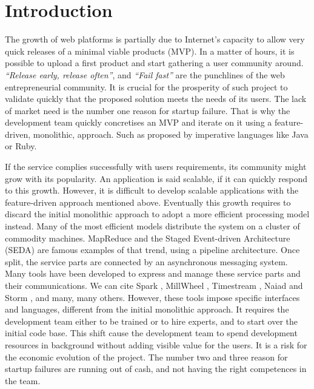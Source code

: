 \section{Introduction}

The growth of web platforms is partially due to Internet's capacity to allow very quick releases of a minimal viable products (MVP).
In a matter of hours, it is possible to upload a first product and start gathering a user community around.
\textit{``Release early, release often''}, and \textit{``Fail fast''} are the punchlines of the web entrepreneurial community.
It is crucial for the prosperity of such project to validate quickly that the proposed solution meets the needs of its users.
The lack of market need is the number one reason for startup failure.
That is why the development team quickly concretises an MVP and iterate on it using a feature-driven, monolithic, approach.
Such as proposed by imperative languages like Java or Ruby.

If the service complies successfully with users requirements, its community might grow with its popularity.
An application is said scalable, if it can quickly respond to this growth.
However, it is difficult to develop scalable applications with the feature-driven approach mentioned above.
Eventually this growth requires to discard the initial monolithic approach to adopt a more efficient processing model instead.
Many of the most efficient models distribute the system on a cluster of commodity machines\cite{Fox1997}.
MapReduce \cite{Dean2008} and the Staged Event-driven Architecture (SEDA) \cite{Welsh2000} are famous examples of that trend, using a pipeline architecture.
Once split, the service parts are connected by an asynchronous messaging system.
Many tools have been developed to express and manage these service parts and their communications.
We can cite Spark \cite{Zaharia2010}, MillWheel \cite{Akidau2013}, Timestream \cite{Qian2013}, Naiad \cite{McSherry} and Storm \cite{Marz2011}\cite{Toshniwal2014}, and many, many others.
However, these tools impose specific interfaces and languages, different from the initial monolithic approach.
It requires the development team either to be trained or to hire experts, and to start over the initial code base.
This shift cause the development team to spend development resources in background without adding visible value for the users.
It is a risk for the economic evolution of the project.
The number two and three reason for startup failures are running out of cash, and not having the right competences in the team.

